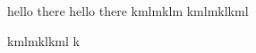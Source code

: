 \documentclass[12pt, a4paper]{article}
\begin{document}
hello there hello there
kmlmklm
kmlmklkml

\newpage

kmlmklkml
k
\end{document}
